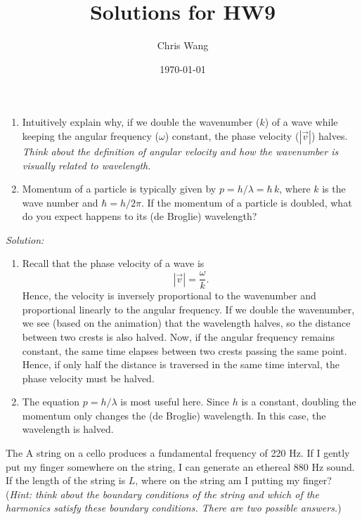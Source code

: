 \documentclass{article}
\title{Solutions for HW9}
\author{Chris Wang}
\date{\today}
\begin{document}
\maketitle

\begin{tcolorbox}[colframe=blue!50!black, arc=2mm, title=\textsc{Practice 1}]
	\begin{enumerate}[label=(\alph*)]
		\item Intuitively explain why, if we double the wavenumber ($k$) of a wave while keeping the angular frequency ($\omega$) constant, the phase velocity ($|\vec{v}|$) halves. \textit{Think about the definition of angular velocity and how the wavenumber is visually related to wavelength.}
		\item Momentum of a particle is typically given by $p = h / \lambda = \hbar\, k$, where $k$ is the wave number and $\hbar = h / 2\pi$. If the momentum of a particle is doubled, what do you expect happens to its (de Broglie) wavelength? 
	\end{enumerate}
\end{tcolorbox}

\textit{Solution:}

\vspace{1em}

\begin{enumerate}[label=(\alph*)]
    \item Recall that the phase velocity of a wave is 
    \[
    |\vec{v}| = \frac{\omega}{k}.
    \]
    Hence, the velocity is inversely proportional to the wavenumber and proportional linearly to the angular frequency. If we double the wavenumber, we see (based on the animation) that the wavelength halves, so the distance between two crests is also halved. Now, if the angular frequency remains constant, the same time elapses between two crests passing the same point. Hence, if only half the distance is traversed in the same time interval, the phase velocity must be halved.
    \item The equation $p= h / \lambda$ is most useful here. Since $h$ is a constant, doubling the momentum only changes the (de Broglie) wavelength. In this case, the wavelength is halved.
\end{enumerate}

\newpage

\begin{tcolorbox}[colframe=blue!50!black, arc=2mm, title=\textsc{Practice 2}]
	The A string on a cello produces a fundamental frequency of 220 Hz. If I gently put my finger somewhere on the string, I can generate an ethereal 880 Hz sound. If the length of the string is $L$, where on the string am I putting my finger? (\textit{Hint: think about the boundary conditions of the string and which of the harmonics satisfy these boundary conditions. There are two possible answers.})
\end{tcolorbox}
\end{document}
